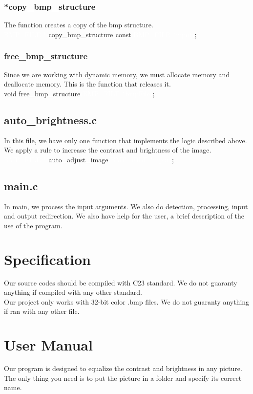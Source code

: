 \documentclass{article}
\begin{document}
\subsubsection{*copy\_bmp\_structure}
The function creates a copy of the bmp structure.
\\[1\baselineskip]
\colorbox{black!80}{\textcolor{white}{BMP\_FILE *} \textcolor{yellow!85}{copy\_bmp\_structure}\textcolor{white}{(}\textcolor{orange!65}{const }\textcolor{white}{BMP\_FILE *input)}\textcolor{orange!65}{;}}
\subsubsection{free\_bmp\_structure}
Since we are working with dynamic memory, we must allocate memory and deallocate memory. This is the function that releases it.
\\[1\baselineskip]
\colorbox{black!80}{\textcolor{orange!65}{void} \textcolor{yellow!85}{free\_bmp\_structure}\textcolor{white}{(BMP\_FILE *bmpFile)}\textcolor{orange!65}{;}}
\subsection{auto\_brightness.c}
In this file, we have only one function that implements the logic described above. We apply a rule to increase the contrast and brightness of the image.
\\[1\baselineskip]
\colorbox{black!80}{\textcolor{white}{BMP\_FILE *} \textcolor{yellow!85}{auto\_adjust\_image}\textcolor{white}{(}\textcolor{white}{BMP\_FILE *input)}\textcolor{orange!65}{;}}
\subsection{main.c}
In main, we process the input arguments. We also do detection, processing, input and output redirection. We also have help for the user, a brief description of the use of the program.
\section{Specification}
Our source codes should be compiled with C23 standard. We do not guaranty anything if compiled with any other standard.
\\
Our project only works with 32-bit color .bmp files. We do not guaranty anything if ran with any other file.
\section{User Manual}
Our program is designed to equalize the contrast and brightness in any picture. The only thing you need is to put the picture in a folder and specify its correct name.
\end{document}
